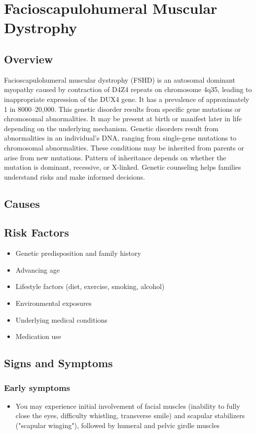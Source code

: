 \chapter{Facioscapulohumeral Muscular Dystrophy}
\label{sec:Facioscapulohumeral Muscular Dystrophy}

\section{Overview}
Facioscapulohumeral muscular dystrophy (FSHD) is an autosomal dominant myopathy caused by contraction of D4Z4 repeats on chromosome 4q35, leading to inappropriate expression of the DUX4 gene. It has a prevalence of approximately 1 in 8000--20,000. This genetic disorder results from specific gene mutations or chromosomal abnormalities. It may be present at birth or manifest later in life depending on the underlying mechanism. Genetic disorders result from abnormalities in an individual's DNA, ranging from single-gene mutations to chromosomal abnormalities. These conditions may be inherited from parents or arise from new mutations. Pattern of inheritance depends on whether the mutation is dominant, recessive, or X-linked. Genetic counseling helps families understand risks and make informed decisions.
\section{Causes}
\section{Risk Factors}

\begin{itemize}[noitemsep]
  \item Genetic predisposition and family history
  \item Advancing age
  \item Lifestyle factors (diet, exercise, smoking, alcohol)
  \item Environmental exposures
  \item Underlying medical conditions
  \item Medication use
\end{itemize}
\section{Signs and Symptoms}

\subsection{Early symptoms}
\begin{itemize}[noitemsep]
  \item You may experience initial involvement of facial muscles (inability to fully close the eyes, difficulty whistling, transverse smile) and scapular stabilizers ("scapular winging"), followed by humeral and pelvic girdle muscles
\end{itemize}

